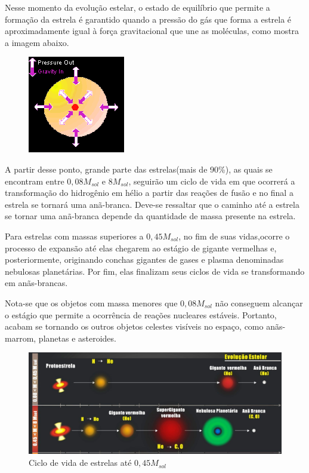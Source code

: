 \documentclass[article,12pt,oneside,a4paper,english,brazil,sumario=tradicional]{abntex2}
\begin{document}
Nesse momento da evolução estelar, o estado de equilíbrio que permite a formação da estrela é garantido quando a pressão do gás que forma a estrela é aproximadamente igual à força gravitacional que une as moléculas, como mostra a imagem abaixo.

\begin{figure}[h]
	\centering
	\includegraphics[]{estrelaformando.png}
\end{figure}

A partir desse ponto, grande parte das estrelas(mais de 90\%), as quais se encontram entre  $0,08M_{sol}$ e $8M_{sol}$, seguirão um ciclo de vida em que ocorrerá a transformação do hidrogênio em hélio a partir das reações de fusão e no final a estrela se tornará uma anã-branca. Deve-se ressaltar que o caminho até a estrela se tornar uma anã-branca depende da quantidade de massa presente na estrela.

Para estrelas com massas superiores a $0,45M_{sol}$, no fim de suas vidas,ocorre o processo de expansão até elas chegarem ao estágio de gigante vermelhas e, posteriormente, originando conchas gigantes de gases e plasma denominadas nebulosas planetárias. Por fim, elas finalizam seus ciclos de vida se transformando em anãs-brancas.

Nota-se que os objetos com massa menores que $0,08M_{sol}$ não conseguem alcançar o estágio que permite a ocorrência de reações nucleares estáveis. Portanto, acabam se tornando os outros objetos celestes visíveis no espaço, como anãs-marrom, planetas e asteroides. 

\begin{figure}[h]
	\centering
	\includegraphics[width=1.0\linewidth]{evolucao_estrelas.jpg}
	\caption{Ciclo de vida de estrelas até $0,45M_{sol}$}
\end{figure}
\end{document}
